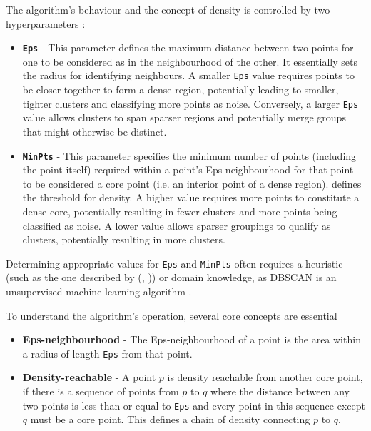 \documentclass[10pt,oneside]{report}
\renewcommand{\citet}[1]{\citeauthor{#1}, \citeyear{#1}}
\begin{document}
The algorithm's behaviour and the concept of density is controlled by two hyperparameters \cite{ester1996density}:
\begin{itemize}
    \item \textbf{\texttt{Eps}} - This parameter defines the maximum distance between two points for one to be considered as in the neighbourhood of the other. It essentially sets the radius for identifying neighbours. A smaller \texttt{Eps} value requires points to be closer together to form a dense region, potentially leading to smaller, tighter clusters and classifying more points as noise. Conversely, a larger \texttt{Eps} value allows clusters to span sparser regions and potentially merge groups that might otherwise be distinct.
    \item \textbf{\texttt{MinPts}} - This parameter specifies the minimum number of points (including the point itself) required within a point's Eps-neighbourhood for that point to be considered a core point (i.e. an interior point of a dense region).  defines the threshold for density. A higher value requires more points to constitute a dense core, potentially resulting in fewer clusters and more points being classified as noise. A lower value allows sparser groupings to qualify as clusters, potentially resulting in more clusters.
\end{itemize}

Determining appropriate values for \texttt{Eps} and \texttt{MinPts} often requires a heuristic (such as the one described by (\citet{ester1996density})) or domain knowledge, as DBSCAN is an unsupervised machine learning algorithm \cite{ester1996density}.

To understand the algorithm's operation, several core concepts are essential \cite{ester1996density}
\begin{itemize}
    \item \textbf{Eps-neighbourhood} - The Eps-neighbourhood of a point is the area within a radius of length \texttt{Eps} from that point.
    \item \textbf{Density-reachable} - A point $p$ is density reachable from another core point, if there is a sequence of points from $p$ to $q$ where the distance between any two points is less than or equal to \texttt{Eps} and every point in this sequence except $q$ must be a core point. This defines a chain of density connecting $p$ to $q$.
\end{itemize}
\end{document}
